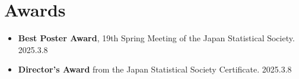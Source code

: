 \documentclass[
  11pt,
]{article}
\providecommand{\tightlist}{%
  \setlength{\itemsep}{0pt}\setlength{\parskip}{0pt}}\usepackage{longtable,booktabs,array}
\renewcommand{\labelitemi}{\textcolor{minty}{\faCheckCircle}} %
\begin{document}
\section{Awards}\label{awards}

\renewcommand{\labelitemi}{\textcolor{minty}{\faThumbsUp}}

\begin{itemize}
\tightlist
\item
  \textbf{Best Poster Award}, 19th Spring Meeting of the Japan
  Statistical Society. \hfill {2025.3.8}
\item
  \textbf{Director's Award} from the Japan Statistical Society
  Certificate. \hfill {2025.3.8}
\end{itemize}

\renewcommand{\labelitemi}{\textcolor{minty}{\faBookmark}}
\end{document}
